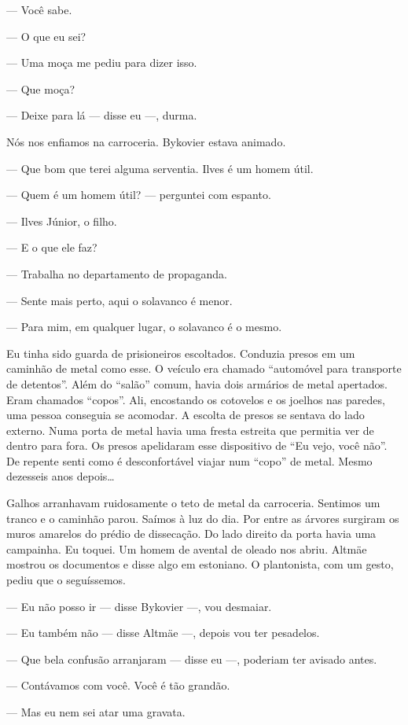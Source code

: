 --- Você sabe.

--- O que eu sei?

--- Uma moça me pediu para dizer isso.

--- Que moça?

--- Deixe para lá --- disse eu ---, durma.

Nós nos enfiamos na carroceria. Bykovier estava animado.

--- Que bom que terei alguma serventia. Ilves é um homem útil.

--- Quem é um homem útil? --- perguntei com espanto.

--- Ilves Júnior, o filho.

--- E o que ele faz?

--- Trabalha no departamento de propaganda.

--- Sente mais perto, aqui o solavanco é menor.

--- Para mim, em qualquer lugar, o solavanco é o mesmo.

Eu tinha sido guarda de prisioneiros escoltados. Conduzia presos em um
caminhão de metal como esse. O veículo era chamado ``automóvel para
transporte de detentos''. Além do ``salão'' comum, havia dois armários
de metal apertados. Eram chamados ``copos''. Ali, encostando os
cotovelos e os joelhos nas paredes, uma pessoa conseguia se acomodar. A
escolta de presos se sentava do lado externo. Numa porta de metal havia
uma fresta estreita que permitia ver de dentro para fora. Os presos
apelidaram esse dispositivo de ``Eu vejo, você não''. De repente senti
como é desconfortável viajar num ``copo'' de metal. Mesmo dezesseis anos
depois\ldots{}

Galhos arranhavam ruidosamente o teto de metal da carroceria. Sentimos um
tranco e o caminhão parou. Saímos à luz do dia. Por entre as árvores
surgiram os muros amarelos do prédio de dissecação. Do lado direito da
porta havia uma campainha. Eu toquei. Um homem de avental de oleado nos
abriu. Altmäe mostrou os documentos e disse algo em estoniano. O
plantonista, com um gesto, pediu que o seguíssemos.

--- Eu não posso ir --- disse Bykovier ---, vou desmaiar.

--- Eu também não --- disse Altmäe ---, depois vou ter pesadelos.

--- Que bela confusão arranjaram --- disse eu ---, poderiam ter avisado
antes.

--- Contávamos com você. Você é tão grandão.

--- Mas eu nem sei atar uma gravata.

